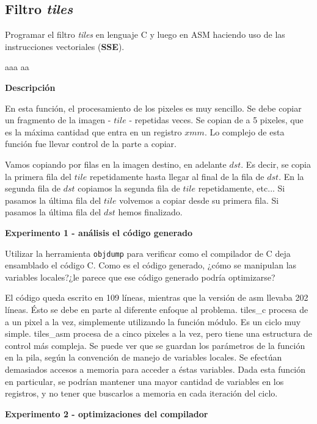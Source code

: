 \subsection*{Filtro \textit{tiles}}

Programar el filtro \textit{tiles} en lenguaje C y luego en ASM haciendo uso de las instrucciones vectoriales (\textbf{SSE}).


aaa
aa    

\vspace*{0.3cm} \noindent
\textbf{Descripción}

En esta función, el procesamiento de los pixeles es muy sencillo. Se debe copiar un fragmento de la imagen - $tile$  - repetidas veces. Se copian de a 5 
pixeles, que es la máxima cantidad que entra en un registro $xmm$. Lo complejo de esta función fue llevar control de la parte a copiar.

Vamos copiando por filas en la imagen destino, en adelante $dst$. Es decir, se copia la primera fila del $tile$ repetidamente hasta llegar al
final de la fila de $dst$. En la segunda fila de $dst$ copiamos la segunda fila de $tile$ repetidamente, etc...
Si pasamos la última fila del $tile$ volvemos a copiar desde su primera fila. Si pasamos la última fila del $dst$ hemos finalizado.


\vspace*{0.3cm} \noindent
\textbf{Experimento 1 - análisis el código generado}

Utilizar la herramienta \verb|objdump| para verificar como el compilador de C deja ensamblado el código C. Como es el código generado, ¿cómo se manipulan las variables locales?¿le parece que ese código generado podría optimizarse?

\hruler

El código queda escrito en 109 líneas, mientras que la versión de asm llevaba 202 líneas. Ésto se debe en parte al diferente enfoque al problema.
tiles\_c procesa de a un pixel a la vez, simplemente utilizando la función módulo. Es un ciclo muy simple. tiles\_asm procesa de a cinco pixeles
a la vez, pero tiene una estructura de control más compleja.
Se puede ver que se guardan los parámetros de la función en la pila, según la convención de manejo de variables locales. Se efectúan demasiados
accesos a memoria para acceder a éstas variables.
Dada esta función en particular, se podrían mantener una mayor cantidad de variables en los registros, y no tener que buscarlos a memoria en cada
iteración del ciclo.


\newpage
\vspace*{0.3cm} \noindent
\textbf{Experimento 2 - optimizaciones del compilador}

